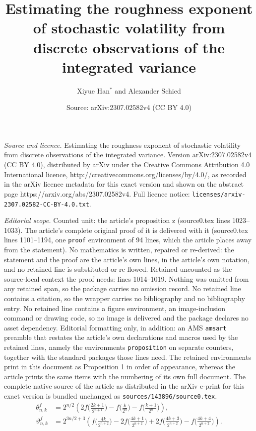 \documentclass[10pt,a4paper]{amsart}
\title{Estimating the roughness exponent of stochastic volatility from discrete observations of the integrated variance}
\author{Xiyue Han$^*$ and Alexander Schied}
\date{Source: arXiv:2307.02582v4 (CC BY 4.0)}
\begin{document}
\maketitle

\noindent\emph{Source and licence.} Estimating the roughness exponent of stochastic volatility from discrete observations of the integrated variance. Version arXiv:2307.02582v4 (CC BY 4.0), distributed by arXiv under the Creative Commons Attribution 4.0 International licence, http://creativecommons.org/licenses/by/4.0/, as recorded in the arXiv licence metadata for this exact version and shown on the abstract page https://arxiv.org/abs/2307.02582v4. Full licence notice: \texttt{licenses/arxiv-2307.02582-CC-BY-4.0.txt}.\par\smallskip

\noindent\textit{Editorial scope.} Counted unit: the article's proposition z (source0.tex lines 1023--1033). The article's complete original proof of it is delivered with it (source0.tex lines 1101--1194, one \texttt{proof} environment of 94 lines, which the article places away from the statement). No mathematics is written, repaired or re-derived: the statement and the proof are the article's own lines, in the article's own notation, and no retained line is substituted or re-flowed.  Retained uncounted as the source-local context the proof needs: lines 1014--1019.  Nothing was omitted from any retained span, so the package carries no omission record.  No retained line contains a citation, so the wrapper carries no bibliography and no bibliography entry.  No retained line contains a figure environment, an image-inclusion command or drawing code, so no image is delivered and the package declares no asset dependency.  Editorial formatting only, in addition: an AMS \texttt{amsart} preamble that restates the article's own declarations and macros used by the retained lines, namely the environments \texttt{proposition} on separate counters, together with the standard packages those lines need.  The retained environments print in this document as Proposition 1 in order of appearance, whereas the article prints the same items with the numbering of its own full document.  The complete native source of the article as distributed in the arXiv e-print for this exact version is bundled unchanged as \texttt{sources/143896/source0.tex}.
\begin{equation}\label{coefficients depending on f eq}
	\begin{split}
		\theta^f_{n,k}& = 2^{n/2}\left(2f\Big(\frac{2k+1}{2^{n+1}}\Big)-f\Big(\frac{k}{2^{n}}\Big) - f\Big(\frac{k+1}{2^{n}}\Big)\right), \\
		\vartheta^f_{n,k}&= 2^{3n/2+3}\left(f\Big(\frac{4k}{2^{n+2}}\Big)-2f\Big(\frac{4k+1}{2^{n+2}}\Big)+2f\Big(\frac{4k+3}{2^{n+2}}\Big)-f\Big(\frac{4k+4}{2^{n+2}}\Big)\right).
	\end{split}
\end{equation}
\end{document}
